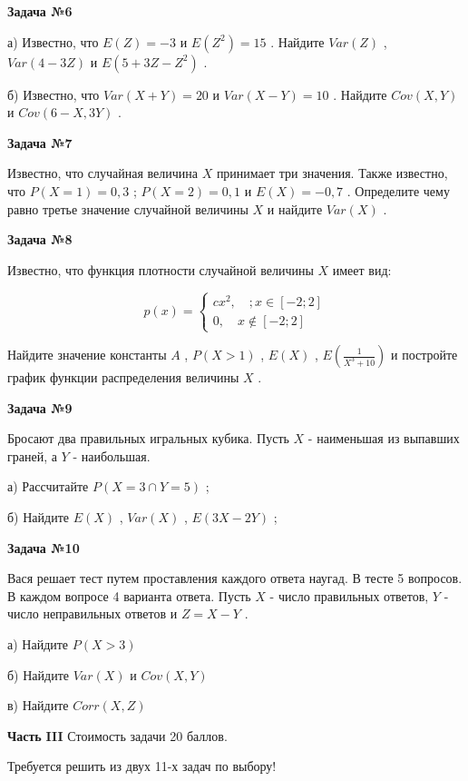 \documentclass[pdftex,12pt,a4paper]{article}
\begin{document}
{\bf Задача №6}

а)	Известно, что  $E\left(Z\right)=-3$  и  $E\left(Z^{2} \right)=15$ . Найдите  $Var\left(Z\right)$ ,  $Var\left(4-3Z\right)$  и  $E\left(5+3Z-Z^{2} \right)$ .

б)	Известно, что  $Var\left(X+Y\right)=20$  и  $Var\left(X-Y\right)=10$ . Найдите  $Cov\left(X,Y\right)$  и  $Cov\left(6-X,3Y\right)$ .

{\bf Задача №7}

Известно, что случайная величина  $X$  принимает три значения. Также известно, что  $P\left(X=1\right)=0,3$ ;  $P\left(X=2\right)=0,1$  и  $E\left(X\right)=-0,7$ . Определите чему равно третье значение случайной величины  $X$  и найдите  $Var\left(X\right)$ .

\pagebreak 

{\bf Задача №8}

Известно, что функция плотности случайной величины  $X$  имеет вид:

$$p\left(x\right)=\left\{\begin{array}{l} {cx^{2} ,\quad ; x\in [-2;2]} \\ {0,\quad x\notin [-2;2]} \end{array}\right. $$

Найдите значение константы  $A$ ,  $P\left(X>1\right)$ ,  $E\left(X\right)$ ,  $E\left(\frac{1}{X^{3} +10} \right)$  и постройте график функции распределения величины  $X$ .

{\bf Задача №9}

Бросают два правильных игральных кубика. Пусть  $X$  - наименьшая из выпавших граней, а  $Y$  - наибольшая.

а)	Рассчитайте  $P\left(X=3\cap Y=5\right)$ ;

б)	Найдите  $E\left(X\right)$ ,  $Var\left(X\right)$ ,  $E\left(3X-2Y\right)$ ;

{\bf Задача №10}

Вася решает тест путем проставления каждого ответа наугад. В тесте 5 вопросов. В каждом вопросе 4 варианта ответа. Пусть  $X$  - число правильных ответов,  $Y$  - число неправильных ответов и  $Z=X-Y$ .

а)	Найдите  $P\left(X>3\right)$ 

б)	Найдите  $Var\left(X\right)$  и  $Cov\left(X,Y\right)$ 

в)	Найдите  $Corr\left(X,Z\right)$ 

{\bf Часть }{\bf III} Стоимость задачи 20 баллов.

Требуется решить {\bf {}} из двух 11-х задач по выбору!
\end{document}
